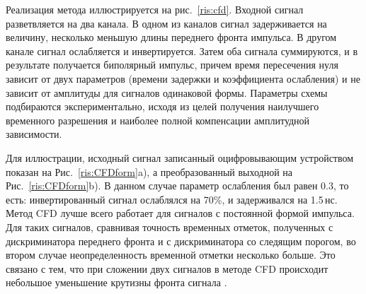 Реализация метода иллюстрируется на рис.~\ref{ris:cfd}.
Входной сигнал разветвляется на два канала. В одном из каналов сигнал задерживается на величину, несколько меньшую длины переднего фронта импульса. В другом канале сигнал ослабляется и инвертируется. Затем оба сигнала суммируются, и в результате получается биполярный импульс, причем время пересечения нуля зависит от двух параметров (времени задержки и коэффициента ослабления) и не зависит от амплитуды для сигналов одинаковой формы. Параметры схемы подбираются экспериментально, исходя из целей получения наилучшего временного разрешения и наиболее полной компенсации амплитудной зависимости.

Для иллюстрации, исходный сигнал записанный оцифровывающим устройством показан на Рис.~\ref{ris:CFDform}a), а преобразованный выходной на Рис.~\ref{ris:CFDform}b).
В данном случае параметр ослабления был равен 0.3, то есть: инвертированный сигнал ослаблялся на 70\%, и задерживался на 1.5\,нс.
Метод CFD лучше всего работает для сигналов с постоянной формой импульса. Для таких сигналов, сравнивая точность временных отметок, полученных с дискриминатора переднего фронта и с дискриминатора со следящим порогом, во втором случае неопределенность временной отметки несколько больше. Это связано с тем, что при сложении двух сигналов в методе CFD происходит небольшое уменьшение крутизны фронта сигнала \cite{dasha}.



